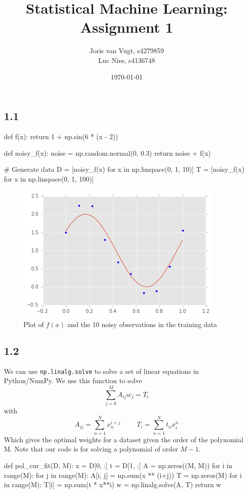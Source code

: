 \documentclass{article}
\title{Statistical Machine Learning: Assignment 1}
\author{Joris van Vugt, s4279859 \\ Luc Nies, s4136748}
\date{\today}
\begin{document}
\maketitle
\section{}

\subsection*{1.1}
\begin{python}
def f(x):
    return 1 + np.sin(6 * (x - 2))

def noisy_f(x):
    noise = np.random.normal(0, 0.3)
    return noise + f(x)

# Generate data
D = [noisy_f(x) for x in np.linspace(0, 1, 10)]
T = [noisy_f(x) for x in np.linspace(0, 1, 100)]
\end{python}
\begin{figure}[H]
\centering
\includegraphics[width=.6\textwidth]{images/sin_d.png}
\caption{Plot of $f(x)$ and the 10 noisy observations in the training data}
\end{figure}

\pagebreak

\subsection*{1.2}
We can use \texttt{np.linalg.solve} to solve a set of linear equations in Python/NumPy. We use this function to solve
$$
\sum_{j=0}^M A_{ij}w_j = T_i
$$
with 
$$
A_{ij} = \sum_{n=1}^N x_n^{i + j} \hspace{1cm}
T_i = \sum_{n=1}^N t_n x_i^n
$$
Which gives the optimal weights for a dataset given the order of the polynomial M. Note that our code is for solving a polynomial of order $M - 1$.
\begin{python}
def pol_cur_fit(D, M):
    x = D[0, :]
    t = D[1, :]
    A = np.zeros((M, M))
    for i in range(M):
        for j in range(M):
            A[i, j] = np.sum(x ** (i+j))
    T = np.zeros(M)
    for i in range(M):
        T[i] = np.sum(t * x**i)
    w = np.linalg.solve(A, T)
    return w
\end{python}
\end{document}
